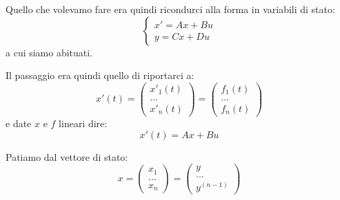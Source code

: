 \documentclass[a4paper,11pt]{article}
\begin{document}
\par\smallskip

Quello che volevamo fare era quindi ricondurci alla forma in variabili di stato:
\[
	\begin{cases}
		x' = Ax + Bu \\ 
		y = Cx + Du
	\end{cases}
\]
a cui siamo abituati.

Il passaggio era quindi quello di riportarci a:
$$
x'(t) = \begin{pmatrix}
x'_1(t) \\
... \\
x'_n(t)
\end{pmatrix}
= \begin{pmatrix}
f_1(t) \\
... \\
f_n(t)
\end{pmatrix}
$$
e date $x$ e $f$ lineari dire:
$$
x'(t) = Ax + Bu
$$

Patiamo dal vettore di stato:
$$
x = \begin{pmatrix}
x_1 \\
... \\
x_n
\end{pmatrix}
= \begin{pmatrix}
y \\
... \\
y^{(n - 1)}
\end{pmatrix}
$$
\end{document}
